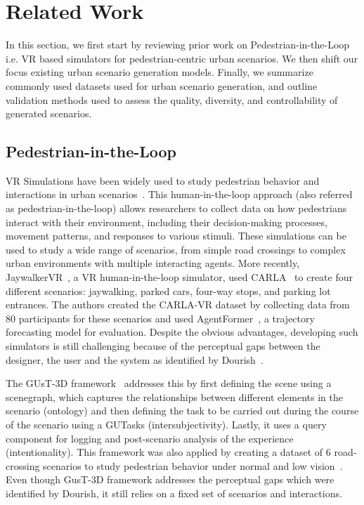 \documentclass{article}
\begin{document}
\section{Related Work}

In this section, we first start by reviewing prior work on Pedestrian-in-the-Loop i.e. VR based simulators for pedestrian-centric urban scenarios. We then shift our focus existing urban scenario generation models. Finally, we summarize commonly used datasets used for urban scenario generation, and outline validation methods used to assess the quality, diversity, and controllability of generated scenarios.

\subsection{Pedestrian-in-the-Loop}

VR Simulations have been widely used to study pedestrian behavior and interactions in urban scenarios~\cite{wu2018using,tran2021review,mukoya2024jaywalkervr,schneider2020virtually}. This human-in-the-loop approach (also referred as pedestrian-in-the-loop\cite{hartmann2017pedestrian}) allows researchers to collect data on how pedestrians interact with their environment, including their decision-making processes, movement patterns, and responses to various stimuli. These simulations can be used to study a wide range of scenarios, from simple road crossings to complex urban environments with multiple interacting agents. More recently, JaywalkerVR~\cite{mukoya2024jaywalkervr}, a VR human-in-the-loop simulator, used CARLA~\cite{dosovitskiy2017carla} to create four different scenarios: jaywalking, parked cars, four-way stops, and parking lot entrances. The authors created the CARLA-VR dataset by collecting data from 80 participants for these scenarios and used AgentFormer~\cite{yuan2021agentformer}, a trajectory forecasting model for evaluation. Despite the obvious advantages, developing such simulators is still challenging because of the perceptual gaps between the designer, the user and the system as identified by Dourish~\cite{dourish2001action}.

The GUsT-3D framework~\cite{wu2022designing} addresses this by first defining the scene using a scenegraph, which captures the relationships between different elements in the scenario (ontology) and then defining the task to be carried out during the course of the scenario using a GUTasks (intersubjectivity). Lastly, it uses a query component for logging and post-scenario analysis of the experience (intentionality). This framework was also applied by creating a dataset of 6 road-crossing scenarios to study pedestrian behavior under normal and low vision~\cite{wu2023exploring}. Even though GusT-3D framework addresses the perceptual gaps which were identified by Dourish, it still relies on a fixed set of scenarios and interactions.
\end{document}
